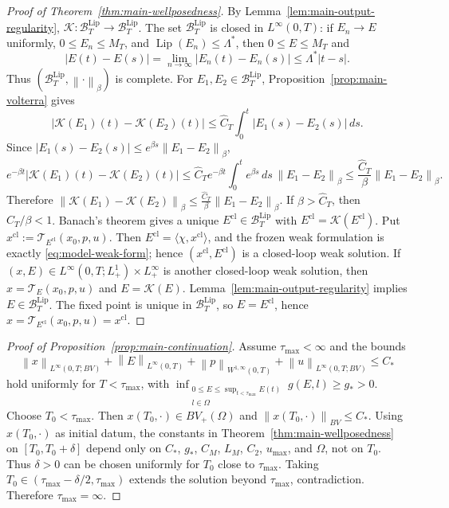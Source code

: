 \documentclass[pdflatex,sn-mathphys-num]{sn-jnl}
\theoremstyle{thmstyleone}
\theoremstyle{definition}
\theoremstyle{remark}
\newcommand{\Om}{\Omega}
\newcommand{\Tcal}{\mathcal{T}}
\newcommand{\Kcal}{\mathcal{K}}
\newcommand{\Btl}{\mathcal{B}_T^{\mathrm{Lip}}}
\newcommand{\Lip}{\operatorname{Lip}}
\newcommand{\norm}[1]{\left\lVert#1\right\rVert}
\newcommand{\abs}[1]{\left\lvert#1\right\rvert}
\numberwithin{equation}{section}
\begin{document}
\begin{proof}[Proof of Theorem~\ref{thm:main-wellposedness}]
By Lemma~\ref{lem:main-output-regularity},
$\displaystyle 
\Kcal:\Btl\to\Btl$.
The set \(\Btl\) is closed in \(L^\infty(0,T)\): if \(E_n\to E\) uniformly,
\(0\le E_n\le M_T\), and \(\Lip(E_n)\le\Lambda^*\), then
\(0\le E\le M_T\) and
\[
\abs{E(t)-E(s)}
=
\lim_{n\to\infty}\abs{E_n(t)-E_n(s)}
\le
\Lambda^*\abs{t-s}.
\]
Thus \((\Btl,\norm{\cdot}_\beta)\) is complete.
For \(E_1,E_2\in\Btl\), Proposition~\ref{prop:main-volterra} gives
\[
\abs{\Kcal(E_1)(t)-\Kcal(E_2)(t)}
\le
\widehat C_T\int_0^t\abs{E_1(s)-E_2(s)}\,ds .
\]
Since \(\abs{E_1(s)-E_2(s)}\le e^{\beta s}\norm{E_1-E_2}_\beta\),
\[
e^{-\beta t}\abs{\Kcal(E_1)(t)-\Kcal(E_2)(t)}
\le
\widehat C_T e^{-\beta t}\int_0^t e^{\beta s}\,ds\,
\norm{E_1-E_2}_\beta
\le
\frac{\widehat C_T}{\beta}\norm{E_1-E_2}_\beta .
\]
Therefore
$\displaystyle 
\norm{\Kcal(E_1)-\Kcal(E_2)}_\beta
\le
\frac{\widehat C_T}{\beta}\norm{E_1-E_2}_\beta$.
If \(\beta>\widehat C_T\), then \(\widehat C_T/\beta<1\). Banach's theorem gives
a unique \(E^{\mathrm{cl}}\in\Btl\) with \(E^{\mathrm{cl}}=\Kcal(E^{\mathrm{cl}})\). Put
\(x^{\mathrm{cl}}:=\Tcal_{E^{\mathrm{cl}}}(x_0,p,u)\). Then
\(E^{\mathrm{cl}}=\langle\chi,x^{\mathrm{cl}}\rangle\), and the frozen weak formulation is
exactly \eqref{eq:model-weak-form}; hence \((x^{\mathrm{cl}},E^{\mathrm{cl}})\) is a
closed-loop weak solution.
If \((x,E)\in L^\infty(0,T;L^1_+)\times L^\infty_+\) is another closed-loop weak
solution, then \(x=\Tcal_E(x_0,p,u)\) and \(E=\Kcal(E)\). Lemma~\ref{lem:main-output-regularity}
implies \(E\in\Btl\). The fixed point is unique in \(\Btl\), so \(E=E^{\mathrm{cl}}\), hence
\(x=\Tcal_{E^{\mathrm{cl}}}(x_0,p,u)=x^{\mathrm{cl}}\).
\end{proof}
\begin{proof}[Proof of Proposition~\ref{prop:main-continuation}]
Assume \(\tau_{\max}<\infty\) and the bounds
\[
\norm{x}_{L^\infty(0,T;BV)}
+
\norm{E}_{L^\infty(0,T)}
+
\norm{p}_{W^{1,\infty}(0,T)}
+
\norm{u}_{L^\infty(0,T;BV)}
\le C_*
\]
hold uniformly for \(T<\tau_{\max}\), with
$\displaystyle 
\inf_{\substack{0\le E\le \sup_{t<\tau_{\max}}E(t)\\ l\in\Om}}g(E,l)\ge g_*>0$.
Choose \(T_0<\tau_{\max}\). Then
$x(T_0,\cdot)\in BV_+(\Om)$ and
$\norm{x(T_0,\cdot)}_{BV}\le C_*$.
Using \(x(T_0,\cdot)\) as initial datum, the constants in
Theorem~\ref{thm:main-wellposedness} on \([T_0,T_0+\delta]\) depend only on
$C_*$, $g_*$, $C_M$, $L_M$, $C_2$, $u_{\max}$, and $\Om$,
not on \(T_0\). Thus \(\delta>0\) can be chosen uniformly for \(T_0\) close to
\(\tau_{\max}\). Taking \(T_0\in(\tau_{\max}-\delta/2,\tau_{\max})\) extends the
solution beyond \(\tau_{\max}\), contradiction. Therefore \(\tau_{\max}=\infty\).
\end{proof}
\end{document}
